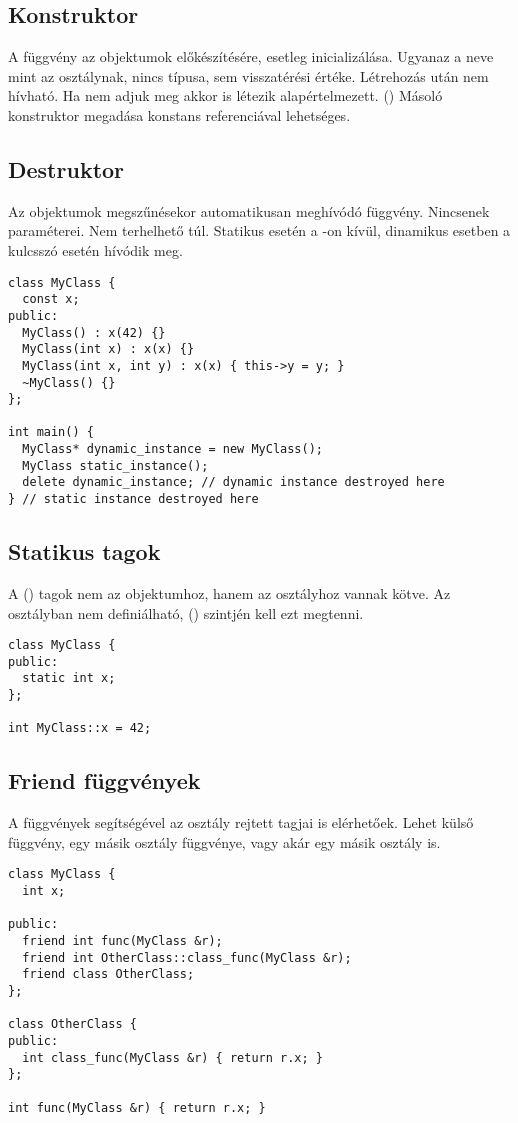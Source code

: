 \documentclass[../../main.tex]{subfiles}
\begin{document}
\subsection{Konstruktor}

A  függvény az objektumok előkészítésére, esetleg
inicializálása. Ugyanaz a neve mint az osztálynak, nincs típusa, sem
visszatérési értéke. Létrehozás után nem hívható. Ha nem adjuk meg akkor
is létezik alapértelmezett. () Másoló konstruktor megadása
konstans referenciával lehetséges.

\subsection{Destruktor}

Az objektumok megszűnésekor automatikusan meghívódó függvény.
Nincsenek paraméterei. Nem terhelhető túl. Statikus  esetén a
-on kívül, dinamikus esetben a  kulcsszó esetén
hívódik meg.

\begin{verbatim}
class MyClass {
  const x;
public:
  MyClass() : x(42) {}
  MyClass(int x) : x(x) {}
  MyClass(int x, int y) : x(x) { this->y = y; }
  ~MyClass() {}
};

int main() {
  MyClass* dynamic_instance = new MyClass();
  MyClass static_instance();
  delete dynamic_instance; // dynamic instance destroyed here
} // static instance destroyed here
\end{verbatim}

\subsection{Statikus tagok}

A  () tagok nem az objektumhoz, hanem az osztályhoz
vannak kötve. Az osztályban nem definiálható,  ()
szintjén kell ezt megtenni.

\begin{verbatim}
class MyClass {
public:
  static int x;
};

int MyClass::x = 42;
\end{verbatim}

\subsection{Friend függvények}

A  függvények segítségével az osztály rejtett tagjai is elérhetőek.
Lehet külső függvény, egy másik osztály függvénye, vagy akár egy másik osztály
is.

\begin{verbatim}
class MyClass {
  int x;

public:
  friend int func(MyClass &r);
  friend int OtherClass::class_func(MyClass &r);
  friend class OtherClass;
};

class OtherClass {
public:
  int class_func(MyClass &r) { return r.x; }
};

int func(MyClass &r) { return r.x; }
\end{verbatim}
\end{document}
